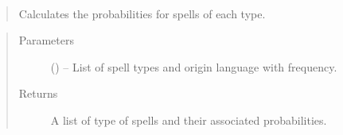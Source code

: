 \documentclass[letterpaper,10pt,english]{sphinxmanual}
\begin{document}
\begin{fulllineitems}
\label{\detokenize{code:hp_spells.calcProb}}~\begin{quote}

Calculates the probabilities for spells of each type.
\end{quote}
\begin{quote}\begin{description}
\item[{Parameters}] \leavevmode
{} (\sphinxstyleliteralemphasis{}\sphinxstyleliteralemphasis{{[}}\sphinxstyleliteralemphasis{}\sphinxstyleliteralemphasis{{[}}\sphinxstyleliteralemphasis{}\sphinxstyleliteralemphasis{{[}}\sphinxstyleliteralemphasis{, }\sphinxstyleliteralemphasis{{]}}\sphinxstyleliteralemphasis{}\sphinxstyleliteralemphasis{, }\sphinxstyleliteralemphasis{{]}}\sphinxstyleliteralemphasis{{]}}\sphinxstyleliteralemphasis{}) -- List of spell types and origin language with frequency.

\item[{Returns}] \leavevmode
A list of type of spells and their associated probabilities.

\end{description}\end{quote}

\end{fulllineitems}

\end{document}
